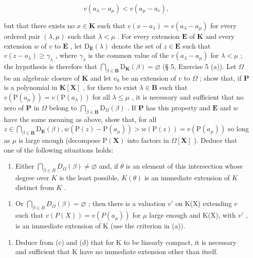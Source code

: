 \[
v (a _ {\lambda} - a _ {\mu}) <   v (a _ {\mu} - a _ {v}),
\]

but that there exists no \(x \in \mathbf{K}\) such that \(v(x - a_{\lambda}) = v(a_{\lambda} - a_{\mu})\) for every ordered pair \((\lambda, \mu)\) such that \(\lambda < \mu\) . For every extension \(\mathbf{E}\) of \(\mathbf{K}\) and every extension \(w\) of \(v\) to \(\mathbf{E}\) , let \(\mathrm{D}_{\mathbf{E}}(\lambda)\) denote the set of \(z \in \mathbf{E}\) such that \(v(z - a_{\lambda}) \geqslant \gamma_{\lambda}\) , where \(\gamma_{\lambda}\) is the common value of the \(v(a_{\lambda} - a_{\mu})\) for \(\lambda < \mu\) ; the hypothesis is therefore that \(\bigcap_{\beta \in \mathbf{B}} \mathrm{D}_{\mathbf{K}}(\beta) = \varnothing\) (§ 5, Exercise 5 (a)). Let \(\Omega\) be an algebraic closure of \(\mathbf{K}\) and let \(v_0\) be an extension of \(v\) to \(\Omega\) ; show that, if \(\mathbf{P}\) is a polynomial in \(\mathbf{K}[\mathbf{X}]\) , for there to exist \(\lambda \in \mathbf{B}\) such that \(v(\mathrm{P}(a_{\mu})) = v(\mathrm{P}(a_{\lambda}))\) for all \(\lambda \leqslant \mu\) , it is necessary and sufficient that no zero of \(\mathbf{P}\) in \(\Omega\) belong to \(\bigcap_{\beta \in \mathbf{B}} \mathrm{D}_{\Omega}(\beta)\) . If \(\mathbf{P}\) has this property and \(\mathbf{E}\) and \(w\) have the same meaning as above, show that, for all \(z \in \bigcap_{\beta \in \mathbf{B}} \mathrm{D}_{\mathbf{E}}(\beta), w(\mathrm{P}(z) - \mathrm{P}(a_{\mu})) > w(\mathrm{P}(z)) = v(\mathrm{P}(a_{\mu}))\) so long as \(\mu\) is large enough (decompose \(\mathrm{P}(\mathbf{X})\) into factors in \(\Omega[\mathbf{X}]\) ). Deduce that one of the following situations holds:

\begin{enumerate}
\def\labelenumi{(\arabic{enumi})}
\tightlist
\item
  Either \(\bigcap_{\beta \in B} D_{\Omega}(\beta) \neq \varnothing\) and, if \(\theta\) is an element of this intersection whose degree over \(K\) is the least possible, \(K(\theta)\) is an immediate extension of \(K\) distinct from \(K\) .
\end{enumerate}

\begin{enumerate}
\def\labelenumi{(\arabic{enumi})}
\setcounter{enumi}{1}
\tightlist
\item
  Or \(\bigcap_{\beta \in B} D_{\Omega}(\beta) = \varnothing\) ; then there is a valuation \(v'\) on K(X) extending \(v\) such that \(v(P(X)) = v(P(a_\mu))\) for \(\mu\) large enough and K(X), with \(v'\) , is an immediate extension of K (use the criterion in (a)).
\end{enumerate}

\begin{enumerate}
\def\labelenumi{(\alph{enumi})}
\setcounter{enumi}{4}
\tightlist
\item
  Deduce from (c) and (d) that for K to be linearly compact, it is necessary and sufficient that K have no immediate extension other than itself.
\end{enumerate}

